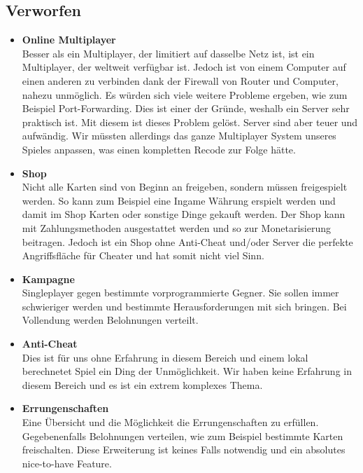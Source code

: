\subsection*{Verworfen}
\begin{itemize}
    \item \textbf{Online Multiplayer} \\
        Besser als ein Multiplayer, der limitiert auf dasselbe Netz ist, ist ein Multiplayer, der weltweit verfügbar ist. Jedoch ist von einem Computer auf einen anderen zu
        verbinden dank der Firewall von Router und Computer, nahezu unmöglich. Es würden sich viele weitere Probleme ergeben, wie zum Beispiel Port-Forwarding. Dies ist einer der Gründe, weshalb ein Server sehr praktisch ist. Mit diesem ist dieses
        Problem gelöst. Server sind aber teuer und aufwändig. Wir müssten allerdings das ganze Multiplayer System unseres Spieles anpassen, was einen kompletten Recode zur Folge hätte.
    \item \textbf{Shop} \\
        Nicht alle Karten sind von Beginn an freigeben, sondern müssen freigespielt werden.
        So kann zum Beispiel eine Ingame Währung erspielt werden und damit im Shop Karten oder sonstige Dinge gekauft werden.
        Der Shop kann mit Zahlungsmethoden ausgestattet werden und so zur Monetarisierung beitragen.
        Jedoch ist ein Shop ohne Anti-Cheat und/oder Server die perfekte Angriffsfläche für Cheater und hat somit nicht viel Sinn.
    \item \textbf{Kampagne} \\
        Singleplayer gegen bestimmte vorprogrammierte Gegner. Sie sollen immer schwieriger werden und bestimmte Herausforderungen mit sich bringen.
        Bei Vollendung werden Belohnungen verteilt.
    \item \textbf{Anti-Cheat} \\
        Dies ist für uns ohne Erfahrung in diesem Bereich und einem lokal berechnetet Spiel ein Ding der Unmöglichkeit.
        Wir haben keine Erfahrung in diesem Bereich und es ist ein extrem komplexes Thema.
    \item \textbf{Errungenschaften} \\
        Eine Übersicht und die Möglichkeit die Errungenschaften zu erfüllen.
        Gegebenenfalls Belohnungen verteilen, wie zum Beispiel bestimmte Karten freischalten.
        Diese Erweiterung ist keines Falls notwendig und ein absolutes nice-to-have Feature.
\end{itemize}

